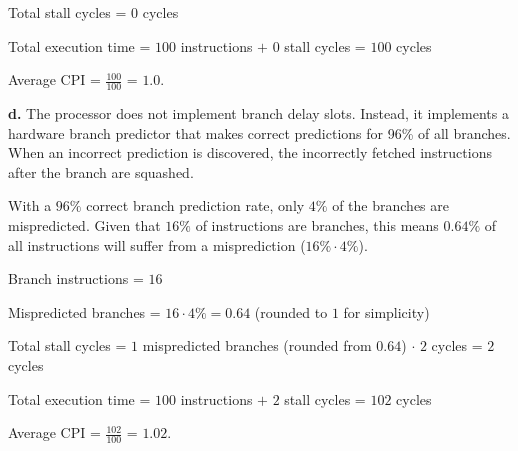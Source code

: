 \documentclass{article}
\begin{document}
Total stall cycles = $0$ cycles

Total execution time = $100$ instructions $+$ $0$ stall cycles = $100$ cycles

Average CPI = $\frac{100}{100}$ = $1.0$.

\textbf{d.} The processor does not implement branch delay slots. Instead, it implements a hardware
branch predictor that makes correct predictions for 96\% of all branches. When an incorrect prediction
is discovered, the incorrectly fetched instructions after the branch are squashed.

With a $96\%$ correct branch prediction rate, only $4\%$ of the branches are mispredicted.
Given that $16\%$ of instructions are branches, this means $0.64\%$ of all instructions
will suffer from a misprediction ($16\% \cdot 4\%$).

Branch instructions = $16$

Mispredicted branches = $16 \cdot 4\% = 0.64$ (rounded to $1$ for simplicity)

Total stall cycles = $1$ mispredicted branches (rounded from $0.64$) $\cdot$ $2$ cycles = $2$ cycles

Total execution time = $100$ instructions $+$ $2$ stall cycles = $102$ cycles

Average CPI = $\frac{102}{100}$ = $1.02$.
\end{document}
